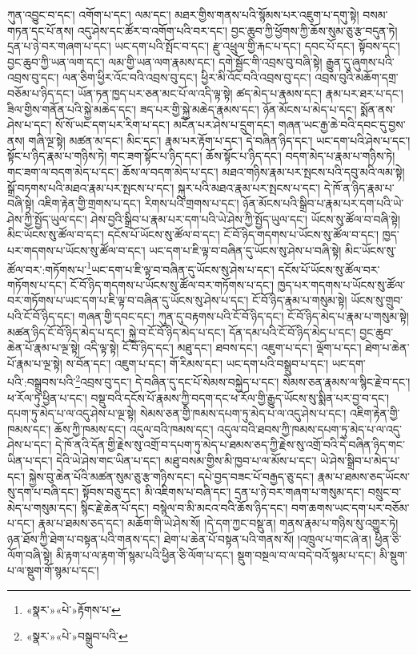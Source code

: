 ཀུན་འབྱུང་བ་དང་། འགོག་པ་དང་། ལམ་དང་། མཐར་གྱིས་གནས་པའི་སྙོམས་པར་འཇུག་པ་དགུ་སྟེ། བསམ་གཏན་དང་པོ་ནས། འདུ་ཤེས་དང་ཚོར་བ་འགོག་པའི་བར་དང་། བྱང་ཆུབ་ཀྱི་ཕྱོགས་ཀྱི་ཆོས་སུམ་ཅུ་རྩ་བདུན་ཏེ། དྲན་པ་ཉེ་བར་གཞག་པ་དང་། ཡང་དག་པའི་སྤོང་བ་དང་། རྫུ་འཕྲུལ་གྱི་རྐང་པ་དང་། དབང་པོ་དང་། སྟོབས་དང་། བྱང་ཆུབ་ཀྱི་ཡན་ལག་དང་། ལམ་གྱི་ཡན་ལག་རྣམས་དང་། དགེ་སྦྱོང་གི་འབྲས་བུ་བཞི་སྟེ། རྒྱུན་དུ་ཞུགས་པའི་འབྲས་བུ་དང་། ལན་ཅིག་ཕྱིར་འོང་བའི་འབྲས་བུ་དང་། ཕྱིར་མི་འོང་བའི་འབྲས་བུ་དང་། འབྲས་བུའི་མཆོག་དགྲ་བཅོམ་པ་ཉིད་དང་། ཡོན་ཏན་ཁྱད་པར་ཅན་མང་པོ་ལ་འདི་ལྟ་སྟེ། ཚད་མེད་པ་རྣམས་དང་། རྣམ་པར་ཐར་པ་དང་། ཟིལ་གྱིས་གནོན་པའི་སྐྱེ་མཆེད་དང་། ཟད་པར་གྱི་སྐྱེ་མཆེད་རྣམས་དང་། ཉོན་མོངས་པ་མེད་པ་དང་། སྨོན་ནས་ཤེས་པ་དང་། སོ་སོ་ཡང་དག་པར་རིག་པ་དང་། མངོན་པར་ཤེས་པ་དྲུག་དང་། གཞན་ཡང་རྒྱ་ཆེ་བའི་དབང་དུ་བྱས་ནས། གཞི་ལྔ་སྟེ། མཚན་མ་དང་། མིང་དང་། རྣམ་པར་རྟོག་པ་དང་། དེ་བཞིན་ཉིད་དང་། ཡང་དག་པའི་ཤེས་པ་དང་། སྟོང་པ་ཉིད་རྣམ་པ་གཉིས་ཏེ། གང་ཟག་སྟོང་པ་ཉིད་དང་། ཆོས་སྟོང་པ་ཉིད་དང་། བདག་མེད་པ་རྣམ་པ་གཉིས་ཏེ། གང་ཟག་ལ་བདག་མེད་པ་དང་། ཆོས་ལ་བདག་མེད་པ་དང་། མཐའ་གཉིས་རྣམ་པར་སྤངས་པའི་དབུ་མའི་ལམ་སྟེ། སྒྲོ་བཏགས་པའི་མཐའ་རྣམ་པར་སྤངས་པ་དང་། སྐུར་པའི་མཐའ་རྣམ་པར་སྤངས་པ་དང་། དེ་ཁོ་ན་ཉིད་རྣམ་པ་བཞི་སྟེ། འཇིག་རྟེན་གྱི་གྲགས་པ་དང་། རིགས་པའི་གྲགས་པ་དང་། ཉོན་མོངས་པའི་སྒྲིབ་པ་རྣམ་པར་དག་པའི་ཡེ་ཤེས་ཀྱི་སྤྱོད་ཡུལ་དང་། ཤེས་བྱའི་སྒྲིབ་པ་རྣམ་པར་དག་པའི་ཡེ་ཤེས་ཀྱི་སྤྱོད་ཡུལ་དང་། ཡོངས་སུ་ཚོལ་བ་བཞི་སྟེ། མིང་ཡོངས་སུ་ཚོལ་བ་དང་། དངོས་པོ་ཡོངས་སུ་ཚོལ་བ་དང་། ངོ་བོ་ཉིད་གདགས་པ་ཡོངས་སུ་ཚོལ་བ་དང་། ཁྱད་པར་གདགས་པ་ཡོངས་སུ་ཚོལ་བ་དང་། ཡང་དག་པ་ཇི་ལྟ་བ་བཞིན་དུ་ཡོངས་སུ་ཤེས་པ་བཞི་སྟེ། མིང་ཡོངས་སུ་ཚོལ་བར་:གཏོགས་པ་\footnote{«སྣར་»«པེ་»རྟོགས་པ་}ཡང་དག་པ་ཇི་ལྟ་བ་བཞིན་དུ་ཡོངས་སུ་ཤེས་པ་དང་། དངོས་པོ་ཡོངས་སུ་ཚོལ་བར་གཏོགས་པ་དང་། ངོ་བོ་ཉིད་གདགས་པ་ཡོངས་སུ་ཚོལ་བར་གཏོགས་པ་དང་། ཁྱད་པར་གདགས་པ་ཡོངས་སུ་ཚོལ་བར་གཏོགས་པ་ཡང་དག་པ་ཇི་ལྟ་བ་བཞིན་དུ་ཡོངས་སུ་ཤེས་པ་དང་། ངོ་བོ་ཉིད་རྣམ་པ་གསུམ་སྟེ། ཡོངས་སུ་གྲུབ་པའི་ངོ་བོ་ཉིད་དང་། གཞན་གྱི་དབང་དང་། ཀུན་དུ་བརྟགས་པའི་ངོ་བོ་ཉིད་དང་། ངོ་བོ་ཉིད་མེད་པ་རྣམ་པ་གསུམ་སྟེ། མཚན་ཉིད་ངོ་བོ་ཉིད་མེད་པ་དང་། སྐྱེ་བ་ངོ་བོ་ཉིད་མེད་པ་དང་། དོན་དམ་པའི་ངོ་བོ་ཉིད་མེད་པ་དང་། བྱང་ཆུབ་ཆེན་པོ་རྣམ་པ་ལྔ་སྟེ། འདི་ལྟ་སྟེ། ངོ་བོ་ཉིད་དང་། མཐུ་དང་། ཐབས་དང་། འཇུག་པ་དང་། ལྡོག་པ་དང་། ཐེག་པ་ཆེན་པོ་རྣམ་པ་ལྔ་སྟེ། ས་བོན་དང་། འཇུག་པ་དང་། གོ་རིམས་དང་། ཡང་དག་པའི་བསྒྲུབ་པ་དང་། ཡང་དག་པའི་:བསྒྲུབས་པའི་\footnote{«སྣར་»«པེ་»བསྒྲུབ་པའི་}འབྲས་བུ་དང་། དེ་བཞིན་དུ་དང་པོ་སེམས་བསྐྱེད་པ་དང་། སེམས་ཅན་རྣམས་ལ་སྙིང་རྗེ་བ་དང་། ཕ་རོལ་ཏུ་ཕྱིན་པ་དང་། བསྡུ་བའི་དངོས་པོ་རྣམས་ཀྱི་བདག་དང་ཕ་རོལ་གྱི་རྒྱུད་ཡོངས་སུ་སྨིན་པར་བྱ་བ་དང་། དཔག་ཏུ་མེད་པ་ལ་འདུ་ཤེས་པ་ལྔ་སྟེ། སེམས་ཅན་གྱི་ཁམས་དཔག་ཏུ་མེད་པ་ལ་འདུ་ཤེས་པ་དང་། འཇིག་རྟེན་གྱི་ཁམས་དང་། ཆོས་ཀྱི་ཁམས་དང་། འདུལ་བའི་ཁམས་དང་། འདུལ་བའི་ཐབས་ཀྱི་ཁམས་དཔག་ཏུ་མེད་པ་ལ་འདུ་ཤེས་པ་དང་། དེ་ཁོ་ནའི་དོན་གྱི་རྗེས་སུ་འགྲོ་བ་དཔག་ཏུ་མེད་པ་ཐམས་ཅད་ཀྱི་རྗེས་སུ་འགྲོ་བའི་དེ་བཞིན་ཉིད་གང་ཡིན་པ་དང་། དེའི་ཡེ་ཤེས་གང་ཡིན་པ་དང་། མཐུ་བསམ་གྱིས་མི་ཁྱབ་པ་ལ་མོས་པ་དང་། ཡེ་ཤེས་སྒྲིབ་པ་མེད་པ་དང་། སྐྱེས་བུ་ཆེན་པོའི་མཚན་སུམ་ཅུ་རྩ་གཉིས་དང་། དཔེ་བྱད་བཟང་པོ་བརྒྱད་ཅུ་དང་། རྣམ་པ་ཐམས་ཅད་ཡོངས་སུ་དག་པ་བཞི་དང་། སྟོབས་བཅུ་དང་། མི་འཇིགས་པ་བཞི་དང་། དྲན་པ་ཉེ་བར་གཞག་པ་གསུམ་དང་། བསྲུང་བ་མེད་པ་གསུམ་དང་། སྙིང་རྗེ་ཆེན་པོ་དང་། བསྙེལ་བ་མི་མངའ་བའི་ཆོས་ཉིད་དང་། བག་ཆགས་ཡང་དག་པར་བཅོམ་པ་དང་། རྣམ་པ་ཐམས་ཅད་དང་། མཆོག་གི་ཡེ་ཤེས་སོ། །དེ་དག་ཀྱང་བསྡུ་ན། གནས་རྣམ་པ་གཉིས་སུ་འགྱུར་ཏེ། ཉན་ཐོས་ཀྱི་ཐེག་པ་བསྟན་པའི་གནས་དང་། ཐེག་པ་ཆེན་པོ་བསྟན་པའི་གནས་སོ། །འཁྲུལ་པ་གང་ཞེ་ན། ཕྱིན་ཅི་ལོག་བཞི་སྟེ། མི་རྟག་པ་ལ་རྟག་གོ་སྙམ་པའི་ཕྱིན་ཅི་ལོག་པ་དང་། སྡུག་བསྔལ་བ་ལ་བདེ་བའོ་སྙམ་པ་དང་། མི་སྡུག་པ་ལ་སྡུག་གོ་སྙམ་པ་དང་། 